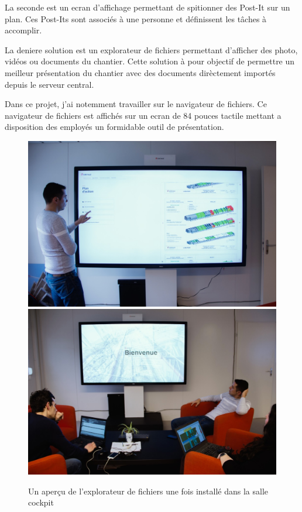 La seconde est un ecran d'affichage permettant de spitionner des Post-It sur un plan.
Ces Post-Its sont associés à une personne et définissent les tâches à accomplir.

La deniere solution est un explorateur de fichiers permettant d'afficher des photo, vidéos ou documents du chantier.
Cette solution à pour objectif de permettre un meilleur présentation du chantier avec des documents dirèctement importés depuis le serveur central.

\medskip

Dans ce projet, j'ai notemment travailler sur le navigateur de fichiers.
Ce navigateur de fichiers est affichés sur un ecran de 84 pouces tactile mettant a disposition des employés un formidable outil de présentation.

\begin{figure}[h]
    \centering
    \includegraphics[scale=0.45]{img/media-reader-pres-1.jpg}
    \includegraphics[scale=0.45]{img/media-reader-pres-2.jpg}
    \caption{Un aperçu de l'explorateur de fichiers une fois installé dans la salle cockpit}
\end{figure}

